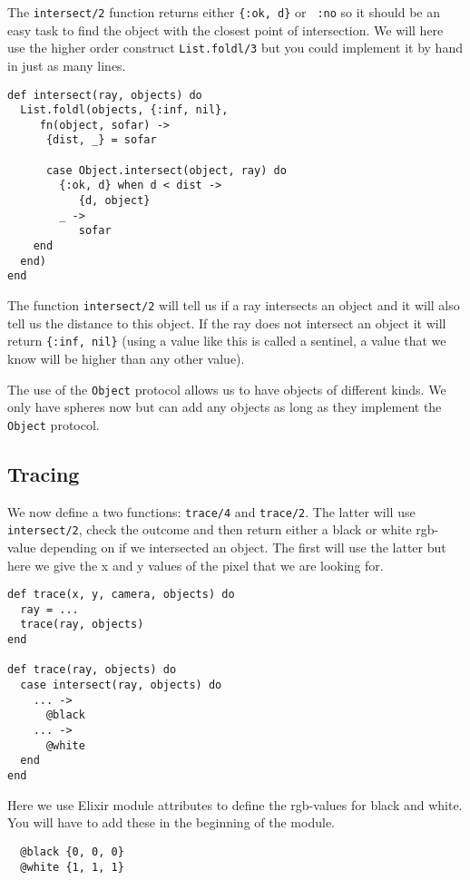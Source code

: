\documentclass[a4paper,11pt]{article}
\begin{document}
The {\tt intersect/2} function returns either {\tt \{:ok, d\}} or {\tt
  :no} so it should be an easy task to find the object with the closest
point of intersection. We will here use the higher order construct
{\tt List.foldl/3} but you could implement it by hand in just as many lines.

\begin{verbatim}
def intersect(ray, objects) do
  List.foldl(objects, {:inf, nil},
     fn(object, sofar) ->
      {dist, _} = sofar

      case Object.intersect(object, ray) do
        {:ok, d} when d < dist ->
           {d, object}
        _ ->
           sofar
    end
  end)
end
\end{verbatim}

The function {\tt intersect/2} will tell us if a ray intersects an
object and it will also tell us the distance to this object. If the
ray does not intersect an object it will return {\tt \{:inf, nil\}}
(using a value like this is called a sentinel, a value that we know
will be higher than any other value).

The use of the {\tt Object} protocol allows us to have objects of
different kinds. We only have spheres now but can add any objects as
long as they implement the {\tt Object} protocol.

\subsection*{Tracing}

We now define a two functions: {\tt trace/4} and {\tt trace/2}. The
latter will use {\tt intersect/2}, check the outcome and then return
either a black or white rgb-value depending on if we intersected an
object. The first will use the latter but here we give the x and y
values of the pixel that we are looking for.

\begin{verbatim}
def trace(x, y, camera, objects) do
  ray = ...
  trace(ray, objects)
end

def trace(ray, objects) do
  case intersect(ray, objects) do
    ... ->
      @black
    ... ->
      @white
  end
end
\end{verbatim}

Here we use Elixir module attributes to define the rgb-values for
black and white. You will have to add these in the beginning of the
module.

\begin{verbatim}
  @black {0, 0, 0}
  @white {1, 1, 1}
\end{verbatim}
\end{document}
